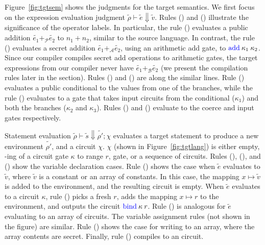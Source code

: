 Figure~\ref{fig:tgtsem} shows the judgments for the target
semantics. We first focus on the expression evaluation judgment
$\widetilde{\rho} \vdash \widetilde{e} \Downarrow
\widetilde{v}$. Rules ({}) and ({}) illustrate
the significance of the operator labels. In particular, the rule
({}) evaluates a public addition $\widetilde{e_{1}}
+_{\mathcal{P}} \widetilde{e_{2}}$ to $n_{1} + n_{2}$, similar to the
source language. In contrast, the rule
({}) evaluates a secret addition $\widetilde{e_{1}}
+_{\mathcal{A}} \widetilde{e_{2}}$, using an arithmetic add
gate, to $\kw{add}\:\kappa_{1}\:\kappa_{2}$. Since our compiler
compiles secret add operations to arithmetic gates, the target
expressions from our compiler never have $\widetilde{e_{1}}
+_{\mathcal{B}} \widetilde{e_{2}}$ (we present the compilation rules
later in the section). Rules ({}) and ({})
are along the similar lines. Rule ({}) evaluates a public
conditional to the values from one of the branches, while the rule
({}) evaluates to a  gate that takes input
circuits from the conditional ($\kappa_{1}$) and both the branches
($\kappa_{2}$ and $\kappa_{3}$). Rules ({}) and
({}) evaluate to the coerce and input gates respectively.

Statement evaluation $\widetilde{\rho} \vdash \widetilde{s} \Downarrow
\widetilde{\rho'}; \chi$ evaluates a target statement to produce a new
environment $\widetilde{\rho'}$, and a circuit $\chi$. $\chi$ (shown
in Figure~\ref{fig:tgtlang}) is either empty, -ing of a
circuit gate $\kappa$ to range $r$,  gate, or a sequence of
circuits. Rules ({}), ({}), and
({}) show the variable declaration cases. Rule
({}) shows the case when $\widetilde{e}$ evaluates to
$\widetilde{v}$, where $\widetilde{v}$ is a constant or an array of
constants. In this case, the mapping $x \mapsto \widetilde{v}$ is
added to the environment, and the resulting circuit is empty. When
$\widetilde{e}$ evaluates to a circuit $\kappa$, rule
({}) picks a fresh $r$, adds the mapping $x \mapsto r$
to the environment, and outputs the circuit
$\kw{bind}\:\kappa\:r$. Rule ({}) is analogous for
$\widetilde{e}$ evaluating to an array of circuits. The variable
assignment rules (not shown in the figure) are similar. Rule
({}) shows the case for writing to an array, where the
array contents are secret. Finally, rule ({}) compiles to an
 circuit.

